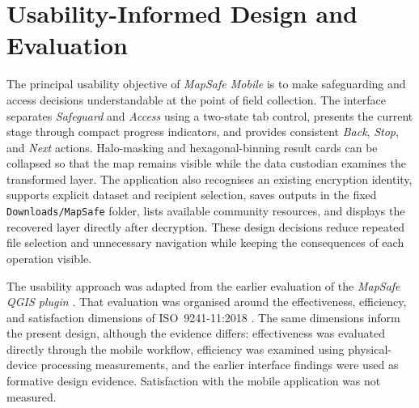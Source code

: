 \documentclass[]{interact}
\begin{document}
%


\section{Usability-Informed Design and Evaluation}
\label{sec:usability-design}

The principal usability objective of \textit{MapSafe Mobile} is to make safeguarding and access decisions understandable at the point of field collection. The interface separates \emph{Safeguard} and \emph{Access} using a two-state tab control, presents the current stage through compact progress indicators, and provides consistent \emph{Back}, \emph{Stop}, and \emph{Next} actions. Halo-masking and hexagonal-binning result cards can be collapsed so that the map remains visible while the data custodian examines the transformed layer. The application also recognises an existing encryption identity, supports explicit dataset and recipient selection, saves outputs in the fixed \texttt{Downloads/MapSafe} folder, lists available community resources, and displays the recovered layer directly after decryption. These design decisions reduce repeated file selection and unnecessary navigation while keeping the consequences of each operation visible.

The usability approach was adapted from the earlier evaluation of the \textit{MapSafe QGIS plugin} \citep{sharma2025mapsafe}. That evaluation was organised around the effectiveness, efficiency, and satisfaction dimensions of ISO~9241-11:2018 \citep{ISO2018ergonomics}. The same dimensions inform the present design, although the evidence differs: effectiveness was evaluated directly through the mobile workflow, efficiency was examined using physical-device processing measurements, and the earlier interface findings were used as formative design evidence. Satisfaction with the mobile application was not measured.
\end{document}
